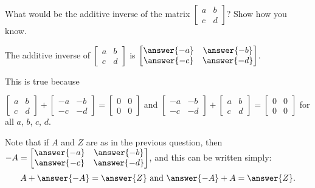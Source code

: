 \documentclass[space,nooutcomes]{ximera}
\begin{document}
\begin{question}
What would be the additive inverse of the matrix 
$\begin{bmatrix} a&b \\ c&d \end{bmatrix}$?  
Show how you know.  
\begin{solution}
The additive inverse of $\begin{bmatrix} a&b \\ c&d \end{bmatrix}$ is 
$\begin{bmatrix} \answer{-a}&\answer{-b} \\ \answer{-c}&\answer{-d} \end{bmatrix}$.  

\begin{question}
This is true because 

$\begin{bmatrix} a&b \\ c&d \end{bmatrix} + \begin{bmatrix} -a&-b \\ -c&-d \end{bmatrix} = 
\begin{bmatrix} 0&0 \\ 0&0 \end{bmatrix}$ 
and
$\begin{bmatrix} -a&-b \\ -c&-d \end{bmatrix} + \begin{bmatrix} a&b \\ c&d \end{bmatrix} = 
\begin{bmatrix} 0&0 \\ 0&0 \end{bmatrix}$ for all $a$, $b$, $c$, $d$. 

Note that if $A$ and $Z$ are as in the previous question, then $-A = \begin{bmatrix} \answer{-a}&\answer{-b} \\ \answer{-c}&\answer{-d} \end{bmatrix}$, and this can be written simply:  
\[
A + \answer{-A} = \answer{Z}\text{ and }\answer{-A} + A = \answer{Z}. 
\]
\end{question}
\end{solution}
\end{question}
\end{document}
